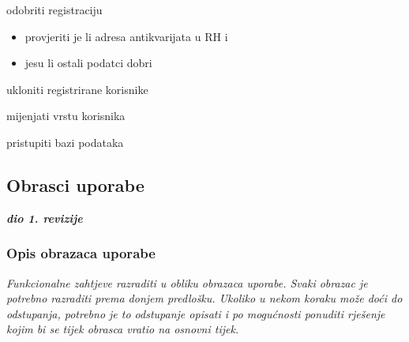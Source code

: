 \begin{packed_enum}
				\item {}
					\begin{packed_enum}
						\item odobriti registraciju
							\begin{itemize}
								\item provjeriti je li adresa antikvarijata u RH i 
								\item jesu li ostali podatci dobri
							\end{itemize}
						\item ukloniti registrirane korisnike
						\item mijenjati vrstu korisnika
						\item pristupiti bazi podataka
					\end{packed_enum}
					
				\item {}
			
			\eject 
			
			
				
			\subsection{Obrasci uporabe}
				
				\textbf{\textit{dio 1. revizije}}
				
				\subsubsection{Opis obrazaca uporabe}
					\textit{Funkcionalne zahtjeve razraditi u obliku obrazaca uporabe. Svaki obrazac je potrebno razraditi prema donjem predlošku. Ukoliko u nekom koraku može doći do odstupanja, potrebno je to odstupanje opisati i po mogućnosti ponuditi rješenje kojim bi se tijek obrasca vratio na osnovni tijek.}\\
					

					\noindent {}
					\begin{packed_item}
	

\end{packed_item}
\end{packed_enum}
